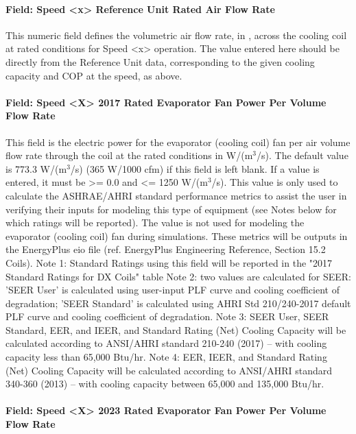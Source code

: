 \paragraph{Field: Speed \textless{}x\textgreater{} Reference Unit Rated Air Flow Rate}\label{field-speed-x-reference-unit-rated-air-flow-rate}

This numeric field defines the volumetric air flow rate, in \si{\volumeFlowRate}, across the cooling coil at rated conditions for Speed \textless{}x\textgreater{} operation. The value entered here should be directly from the Reference Unit data, corresponding to the given cooling capacity and COP at the speed, as above.

\paragraph{Field: Speed \textless{}X\textgreater{} 2017 Rated Evaporator Fan Power Per Volume Flow Rate}

This field is the electric power for the evaporator (cooling coil) fan per air volume flow rate through the coil at the rated conditions in W/(m\(^{3}\)/s). The default value is 773.3 W/(m\(^{3}\)/s) (365 W/1000 cfm) if this field is left blank. If a value is entered, it must be \textgreater{}= 0.0 and \textless{}= 1250 W/(m\(^{3}\)/s). This value is only used to calculate the ASHRAE/AHRI standard performance metrics to assist the user in verifying their inputs for modeling this type of equipment (see Notes below for which ratings will be reported).  The value is not used for modeling the evaporator (cooling coil) fan during simulations.  These metrics will be outputs in the EnergyPlus eio file (ref. EnergyPlus Engineering Reference, Section 15.2 Coils).
Note 1: Standard Ratings using this field will be reported in the "2017 Standard Ratings for DX Coils" table
Note 2: two values are calculated for SEER: 'SEER User' is calculated using user-input PLF curve and cooling coefficient of degradation; 'SEER Standard' is calculated using AHRI Std 210/240-2017 default PLF curve and cooling coefficient of degradation.
Note 3: SEER User, SEER Standard, EER, and IEER, and Standard Rating (Net) Cooling Capacity will be calculated according to ANSI/AHRI standard 210-240 (2017) -- with cooling capacity less than 65,000 Btu/hr.
Note 4: EER, IEER, and Standard Rating (Net) Cooling Capacity will be calculated according to ANSI/AHRI standard 340-360 (2013) -- with cooling capacity between 65,000 and 135,000 Btu/hr.

\paragraph{Field: Speed \textless{}X\textgreater{} 2023 Rated Evaporator Fan Power Per Volume Flow Rate}

